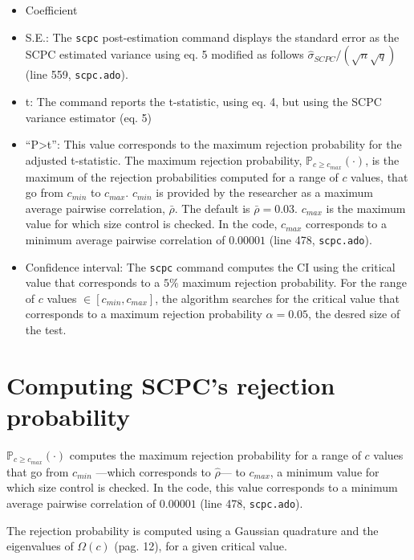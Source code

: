 \documentclass[
]{article}
\providecommand{\tightlist}{%
  \setlength{\itemsep}{0pt}\setlength{\parskip}{0pt}}\usepackage{longtable,booktabs,array}
\begin{document}
\begin{itemize}
\tightlist
\item
  Coefficient
\item
  S.E.: The \texttt{scpc} post-estimation command displays the standard
  error as the SCPC estimated variance using eq. 5 modified as follows
  \(\hat\sigma_{SCPC}/(\sqrt{n}\sqrt{q})\) (line 559,
  \texttt{scpc.ado}).
\item
  t: The command reports the t-statistic, using eq. 4, but using the
  SCPC variance estimator (eq. 5)
\item
  ``P\textgreater\textbar t\textbar{}'': This value corresponds to the
  maximum rejection probability for the adjusted t-statistic. The
  maximum rejection probability, \(\mathbb{P}_{c\ge c_{max}}(\cdot)\),
  is the maximum of the rejection probabilities computed for a range of
  \(c\) values, that go from \(c_{min}\) to \(c_{max}\). \(c_{min}\) is
  provided by the researcher as a maximum average pairwise correlation,
  \(\bar\rho\). The default is \(\bar\rho=0.03\). \(c_{max}\) is the
  maximum value for which size control is checked. In the code,
  \(c_{max}\) corresponds to a minimum average pairwise correlation of
  \(0.00001\) (line 478, \texttt{scpc.ado}).
\item
  Confidence interval: The \texttt{scpc} command computes the CI using
  the critical value that corresponds to a \(5\%\) maximum rejection
  probability. For the range of \(c\) values \(\in[c_{min},c_{max}]\),
  the algorithm searches for the critical value that corresponds to a
  maximum rejection probability \(\alpha=0.05\), the desred size of the
  test.
\end{itemize}

\hypertarget{computing-scpcs-rejection-probability}{%
\section{Computing SCPC's rejection
probability}\label{computing-scpcs-rejection-probability}}

\(\mathbb{P}_{c\ge c_{max}}(\cdot)\) computes the maximum rejection
probability for a range of \(c\) values that go from \(c_{min}\)
---which corresponds to \(\hat\rho\)--- to \(c_{max}\), a minimum value
for which size control is checked. In the code, this value corresponds
to a minimum average pairwise correlation of \(0.00001\) (line 478,
\texttt{scpc.ado}).

The rejection probability is computed using a Gaussian quadrature and
the eigenvalues of \(\Omega(c)\) (pag. 12), for a given critical value.
\end{document}
